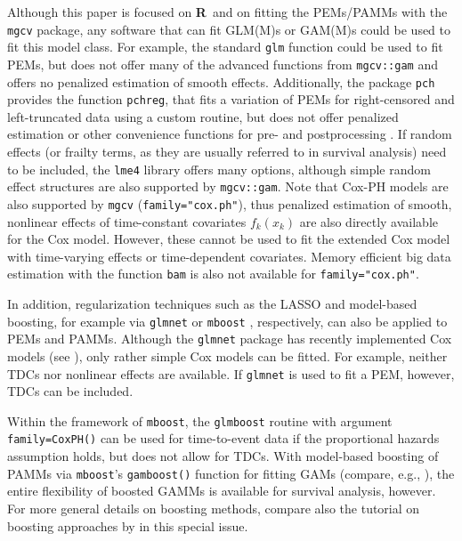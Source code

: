 \documentclass[submit]{smj}
\newcommand{\Rlang}{\textbf{\textsf{R}}}
\newcommand{\code}[1]{{\small \texttt{#1}}}
\begin{document}
Although this paper is focused on \Rlang\ and on fitting the
PEMs/PAMMs with the \code{mgcv} package, any software that can fit GLM(M)s or
GAM(M)s could be used to fit this model class. For example, the standard
\code{glm} function could be used to fit PEMs, but does not offer many of
the advanced functions from \code{mgcv::gam} and offers no penalized estimation
of smooth effects. Additionally, the package \code{pch} provides the function
\code{pchreg}, that fits a variation of PEMs for right-censored and left-truncated
data using a custom routine, but does not offer penalized estimation or other
convenience functions for pre- and postprocessing \citep{Frumento2016}.
If random effects (or frailty terms, as they are usually
referred to in survival analysis) need to be included, the \code{lme4} library
\citep{BaEtAl:2015} offers many options, although simple random effect structures are also
supported by \code{mgcv::gam}. Note that Cox-PH models are also supported by
\code{mgcv} (\code{family="cox.ph"}), thus penalized estimation of smooth,
nonlinear effects of time-constant covariates $f_k({x_k})$ are also directly
available for the Cox model. However, these cannot be used to fit the extended
Cox model with time-varying effects or time-dependent covariates. Memory efficient
big data estimation with the function \code{bam} is also not available for
\code{family="cox.ph"}.

In addition, regularization
techniques such as the LASSO and model-based boosting, for example via
\texttt{glmnet} \citep{FriEtAL:2010} or \texttt{mboost} \citep{Hotetal:2016},
respectively, can also be applied to PEMs and PAMMs.
Although the \texttt{glmnet} package has recently implemented Cox
models (see \citealp{SimEtAl:2011}), %
only rather simple Cox models can be fitted. For example, neither TDCs nor nonlinear effects are available. If \texttt{glmnet} is used to fit a PEM, however, TDCs can be included.

Within the framework of \texttt{mboost}, the \texttt{glmboost}  routine
with argument \texttt{family=CoxPH()} can be used for time-to-event  data if the
proportional hazards assumption holds, but does not allow for TDCs. With model-based boosting of PAMMs via \texttt{mboost}'s \texttt{gamboost()} function for fitting GAMs
(compare, e.g., \citealp{HotBue:2006}), the entire flexibility of boosted GAMMs is available for survival analysis, however.
For more general details on boosting methods, compare also the tutorial on
boosting approaches by \citet{MayHof:2017} in this
special issue.
\end{document}
